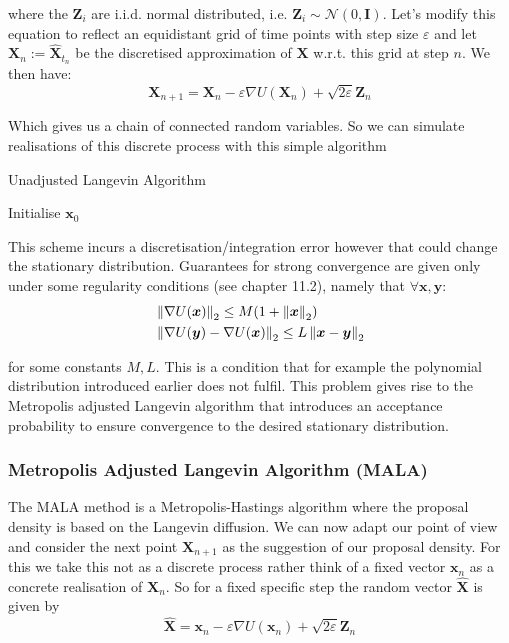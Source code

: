 where the $\bm{Z}_i$ are i.i.d. normal distributed, i.e. $\bm{Z}_i \sim \mathcal{N}(0, \bm{I})$.
Let's modify this equation to reflect an equidistant grid of time points with step size $\varepsilon$ 
and let $\bm{X}_n := \hat{\bm{X}}_{t_n}$ be the discretised approximation of $\bm{X}$ w.r.t. this grid at step $n$. We then have:
\[
	\bm{X}_{n+1} = \bm{X}_n - \varepsilon \nabla U( \bm{X}_n ) + \sqrt{2 \varepsilon} \bm{Z}_n
\]

Which gives us a chain of connected random variables. So we can simulate realisations of this discrete process with this simple algorithm

\NoCaptionOfAlgo
\begin{algorithm}[H]
\SetAlgoLined
\DontPrintSemicolon
{}
\SetAlCapSkip{1em}
\SetAlCapNameFnt{\normalfont\normalsize}
\caption{Unadjusted Langevin Algorithm}

Initialise $\bm{x}_0$ \;

\end{algorithm}

This scheme incurs a discretisation/integration error however that could change the stationary distribution.
Guarantees for strong convergence are given only under some regularity conditions (see \cite{Baldi2017} chapter 11.2), namely that $\forall \bm{x}, \bm{y}:$
\[
\begin{aligned}
	& \left\lVert\nabla U( \bm{x} ) \right\rVert_{2} \leq M (1 + \left\lVert\bm{x}\right\rVert_{2}) \\
	& \left\lVert\nabla U( \bm{y} ) - \nabla U( \bm{x} )\right\rVert_{2} \leq L \left\lVert\bm{x} - \bm{y}\right\rVert_{2} \\
\end{aligned}
\]

for some constants $M, L$. This is a condition that for example the polynomial distribution introduced earlier does not fulfil.
This problem gives rise to the Metropolis adjusted Langevin algorithm that introduces an acceptance probability to ensure convergence to the desired stationary distribution.


\subsubsection{Metropolis Adjusted Langevin Algorithm (MALA)}

The MALA method is a Metropolis-Hastings algorithm where the proposal density is based on the Langevin diffusion.
We can now adapt our point of view and consider the next point $\bm{X}_{n+1}$ as the suggestion of our proposal density.
For this we take this not as a discrete process rather think of a fixed vector $\bm{x}_n$ as a concrete realisation of $\bm{X}_n$. 
So for a fixed specific step the random vector $\hat{\bm{X}}$ is given by
\[
	\hat{\bm{X}} = \bm{x}_n - \varepsilon \nabla U( \bm{x}_n ) + \sqrt{2 \varepsilon} \bm{Z}_n
\]

